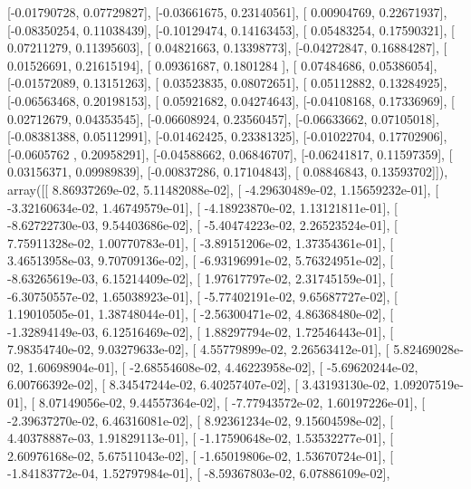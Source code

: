 \documentclass{article}
\begin{document}
       [-0.01790728,  0.07729827],
       [-0.03661675,  0.23140561],
       [ 0.00904769,  0.22671937],
       [-0.08350254,  0.11038439],
       [-0.10129474,  0.14163453],
       [ 0.05483254,  0.17590321],
       [ 0.07211279,  0.11395603],
       [ 0.04821663,  0.13398773],
       [-0.04272847,  0.16884287],
       [ 0.01526691,  0.21615194],
       [ 0.09361687,  0.1801284 ],
       [ 0.07484686,  0.05386054],
       [-0.01572089,  0.13151263],
       [ 0.03523835,  0.08072651],
       [ 0.05112882,  0.13284925],
       [-0.06563468,  0.20198153],
       [ 0.05921682,  0.04274643],
       [-0.04108168,  0.17336969],
       [ 0.02712679,  0.04353545],
       [-0.06608924,  0.23560457],
       [-0.06633662,  0.07105018],
       [-0.08381388,  0.05112991],
       [-0.01462425,  0.23381325],
       [-0.01022704,  0.17702906],
       [-0.0605762 ,  0.20958291],
       [-0.04588662,  0.06846707],
       [-0.06241817,  0.11597359],
       [ 0.03156371,  0.09989839],
       [-0.00837286,  0.17104843],
       [ 0.08846843,  0.13593702]]), array([[  8.86937269e-02,   5.11482088e-02],
       [ -4.29630489e-02,   1.15659232e-01],
       [ -3.32160634e-02,   1.46749579e-01],
       [ -4.18923870e-02,   1.13121811e-01],
       [ -8.62722730e-03,   9.54403686e-02],
       [ -5.40474223e-02,   2.26523524e-01],
       [  7.75911328e-02,   1.00770783e-01],
       [ -3.89151206e-02,   1.37354361e-01],
       [  3.46513958e-03,   9.70709136e-02],
       [ -6.93196991e-02,   5.76324951e-02],
       [ -8.63265619e-03,   6.15214409e-02],
       [  1.97617797e-02,   2.31745159e-01],
       [ -6.30750557e-02,   1.65038923e-01],
       [ -5.77402191e-02,   9.65687727e-02],
       [  1.19010505e-01,   1.38748044e-01],
       [ -2.56300471e-02,   4.86368480e-02],
       [ -1.32894149e-03,   6.12516469e-02],
       [  1.88297794e-02,   1.72546443e-01],
       [  7.98354740e-02,   9.03279633e-02],
       [  4.55779899e-02,   2.26563412e-01],
       [  5.82469028e-02,   1.60698904e-01],
       [ -2.68554608e-02,   4.46223958e-02],
       [ -5.69620244e-02,   6.00766392e-02],
       [  8.34547244e-02,   6.40257407e-02],
       [  3.43193130e-02,   1.09207519e-01],
       [  8.07149056e-02,   9.44557364e-02],
       [ -7.77943572e-02,   1.60197226e-01],
       [ -2.39637270e-02,   6.46316081e-02],
       [  8.92361234e-02,   9.15604598e-02],
       [  4.40378887e-03,   1.91829113e-01],
       [ -1.17590648e-02,   1.53532277e-01],
       [  2.60976168e-02,   5.67511043e-02],
       [ -1.65019806e-02,   1.53670724e-01],
       [ -1.84183772e-04,   1.52797984e-01],
       [ -8.59367803e-02,   6.07886109e-02],
\end{document}
